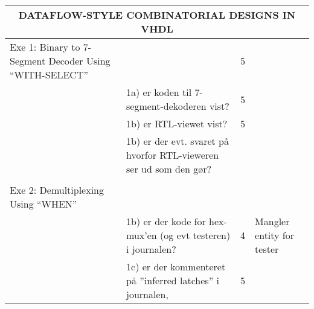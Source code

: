 \begin{table}[h]
    \small
    \begin{tabularx}{\textwidth}{p{3.5cm}Xp{5mm}X}

        \toprule
        \multicolumn{4}{c}{DATAFLOW-STYLE COMBINATORIAL DESIGNS IN VHDL}                                                                                                                                                                \\\midrule
        Exe 1: Binary to 7-Segment Decoder Using “WITH-SELECT” &                                                                                                & 5 &                                                     \\
                                                               & 1a) er koden til 7-segment-dekoderen vist?                                                     & 5 &                                                                \\
                                                               & 1b) er RTL-viewet vist?                                                                        & 5 &                                                                \\
                                                               & 1b) er der evt. svaret på hvorfor RTL-vieweren ser ud som den gør?                             &   &                                                                   \\
                                                               &                                                                                                &   &                                                                   \\\midrule
        Exe 2: Demultiplexing Using “WHEN”                     &                                                                                                &   &                                                                   \\
                                                               & 1b) er der kode for hex-mux’en (og evt testeren) i journalen?                                  & 4 & Mangler entity for tester                                                \\
                                                               & 1c) er der kommenteret på ”inferred latches” i journalen,                                      & 5 &  \\

\end{tabularx}
\end{table}
